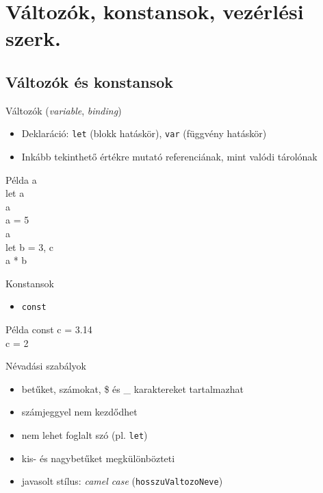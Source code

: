 \section{Változók, konstansok, vezérlési szerk.}

\subsection{Változók és konstansok}

\begin{frame}
    Változók (\emph{variable}, \emph{binding})
    \begin{itemize}
        \item Deklaráció: \texttt{let} (blokk hatáskör), \texttt{var} (függvény hatáskör)
        \item Inkább tekinthető értékre mutató referenciának, mint valódi tárolónak
    \end{itemize}
    \begin{exampleblock}{Példa}
        a \\
        let a\\
        a \\
        a = 5\\
        a \\
        let b = 3, c\\
        a * b \\
    \end{exampleblock}
\end{frame}

\begin{frame}
    Konstansok
    \begin{itemize}
        \item \texttt{const}
    \end{itemize}
    \begin{exampleblock}{Példa}
        const c = 3.14\\
        c = 2 
    \end{exampleblock}
    \vfill
    Névadási szabályok
    \begin{itemize}
        \item betűket, számokat, \$ és \_ karaktereket tartalmazhat
        \item számjeggyel nem kezdődhet
        \item nem lehet foglalt szó (pl. \texttt{let})
        \item kis- és nagybetűket megkülönbözteti
        \item javasolt stílus: \emph{camel case} (\texttt{hosszuValtozoNeve})
    \end{itemize}
\end{frame}

